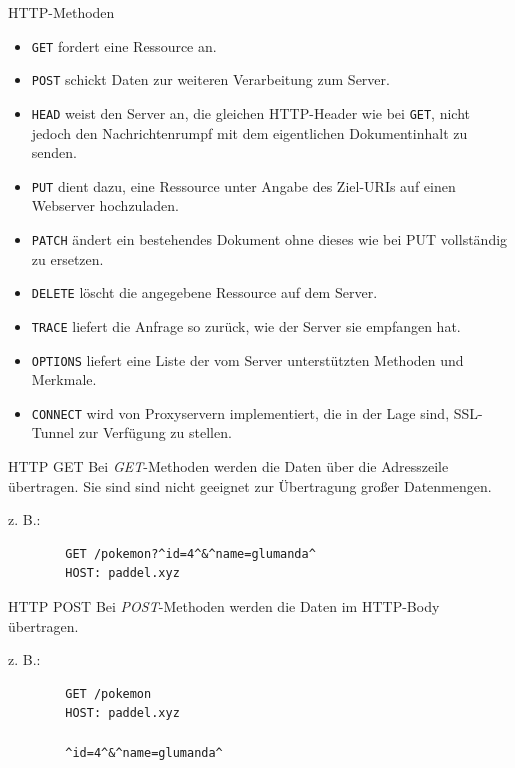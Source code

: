 \begin{defi}{HTTP-Methoden}
    \begin{itemize}
        \item \texttt{GET} fordert eine Ressource an.
        \item \texttt{POST} schickt Daten zur weiteren Verarbeitung zum Server.
        \item \texttt{HEAD} weist den Server an, die gleichen HTTP-Header wie bei \texttt{GET}, nicht jedoch den Nachrichtenrumpf mit dem eigentlichen Dokumentinhalt zu senden.
        \item \texttt{PUT} dient dazu, eine Ressource unter Angabe des Ziel-URIs auf einen Webserver hochzuladen.
        \item \texttt{PATCH} ändert ein bestehendes Dokument ohne dieses wie bei PUT vollständig zu ersetzen.
        \item \texttt{DELETE} löscht die angegebene Ressource auf dem Server.
        \item \texttt{TRACE} liefert die Anfrage so zurück, wie der Server sie empfangen hat.
        \item \texttt{OPTIONS} liefert eine Liste der vom Server unterstützten Methoden und Merkmale.
        \item \texttt{CONNECT} wird von Proxyservern implementiert, die in der Lage sind, SSL-Tunnel zur Verfügung zu stellen.
    \end{itemize}
\end{defi}

\begin{defi}{HTTP GET}
    Bei \emph{GET}-Methoden werden die Daten über die Adresszeile übertragen.
    Sie sind sind nicht geeignet zur Übertragung großer Datenmengen.

    z. B.:
    \begin{lstlisting} 
        GET /pokemon?^id=4^&^name=glumanda^
        HOST: paddel.xyz
    \end{lstlisting}
\end{defi}

\begin{defi}{HTTP POST}
    Bei \emph{POST}-Methoden werden die Daten im HTTP-Body übertragen.

    z. B.:
    \begin{lstlisting}
        GET /pokemon
        HOST: paddel.xyz

        ^id=4^&^name=glumanda^
    \end{lstlisting}
\end{defi}

